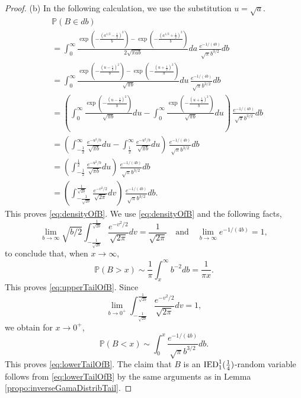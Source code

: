 \documentclass[bj]{imsart}
\numberwithin{equation}{section}
\renewcommand{\P}{\mathbb{P}}
\newcommand{\IGFT}{{\rm IED}}
\newcommand{\1}{\mathbf{1}}
\theoremstyle{definition}
\begin{document}
\begin{proof}
(b) In the following calculation, we use the substitution $ u=\sqrt{a}$.
\begin{align*}
 & \P(B\in db)\\
&= \int_0^{\infty}\frac{\exp\left(-\frac{\left(a^{1/2}-\frac{1}{2}\right)^2}{b}\right)-
\exp\left(-\frac{\left(a^{1/2}+\frac{1}{2}\right)^2}{b}\right)}{2\sqrt{\pi ab}} da\, \frac{e^{-1/(4b)}}{\sqrt{\pi}b^{3/2}} db\\
&=\int_0^{\infty}\frac{\exp\left(-\frac{\left(u-\frac{1}{2}\right)^2}{b}\right)-\exp\left(-\frac{\left(u+\frac{1}{2}\right)^2}{b}\right)}{\sqrt{\pi b}} du\, \frac{e^{-1/(4b)}}{\sqrt{\pi}b^{3/2}} db\\
&=\left(\int_0^{\infty}\frac{\exp\left(-\frac{\left(u-\frac{1}{2}\right)^2}{b}\right)}{\sqrt{\pi b}}du-\int_0^{\infty}\frac{\exp\left(-\frac{\left(u+\frac{1}{2}\right)^2}{b}\right)}{\sqrt{\pi b}} du\right)\, \frac{e^{-1/(4b)}}{\sqrt{\pi}b^{3/2}} db\\
&=\left(\int_{-\frac{1}{2}}^{\infty}\frac{e^{-u^2/b}}{\sqrt{\pi b}}du-\int_{\frac{1}{2}}^{\infty}\frac{e^{-u^2/b}}{\sqrt{\pi b}} du\right)\, \frac{e^{-1/(4b)}}{\sqrt{\pi}b^{3/2}} db\\
&=\left(\int_{-\frac{1}{2}}^{\frac{1}{2}}\frac{e^{-u^2/b}}{\sqrt{\pi b}}du\right)\, \frac{e^{-1/(4b)}}{\sqrt{\pi}b^{3/2}} db\\
&=\left(\int_{-\frac{1}{\sqrt{2b}}}^{\frac{1}{\sqrt{2b}}}\frac{e^{-v^2/2}}{\sqrt{2\pi }}dv\right)\, \frac{e^{-1/(4b)}}{\sqrt{\pi}b^{3/2}} db.
\end{align*}
This proves \eqref{eq:densityOfB}.
We use \eqref{eq:densityOfB} and the following facts, 
$$\lim_{b\to\infty}
\sqrt{b/2}
\int_{-\frac{1}{\sqrt{2b}}}^{\frac{1}{\sqrt{2b}}}
\frac{e^{-v^2/2}}{\sqrt{2\pi }}dv=\frac{1}{\sqrt{2\pi }}\quad \textrm{and}\quad \lim_{b\to\infty}e^{-1/(4b)}= 1,$$
to conclude that, when $x\to \infty$,
$$\P(B>x)\sim \frac{1}{\pi}\int_x^{\infty}b^{-2}db=\frac{1}{\pi x}.$$
This proves \eqref{eq:upperTailOfB}.
Since
$$\lim_{b\to 0^+}\int_{-\frac{1}{\sqrt{2b}}}^{\frac{1}{\sqrt{2b}}}\frac{e^{-v^2/2}}{\sqrt{2\pi }}dv=1,$$
we obtain for $x\to 0^+$,
$$\P(B<x)\sim \int_0^x \frac{e^{-1/(4b)}}{\sqrt{\pi}b^{3/2}}db.$$
This proves \eqref{eq:lowerTailOfB}. The claim that $B$ is an $\IGFT^1_1(\frac{1}{4})$-random variable follows from \eqref{eq:lowerTailOfB} by the same arguments as in Lemma \ref{propo:inverseGamaDistribTail}.
\end{proof}
\end{document}
